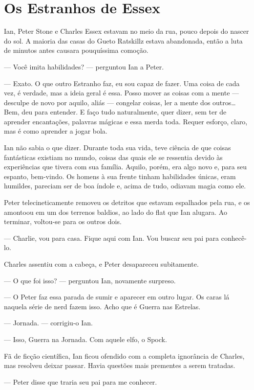 \chapter{Os Estranhos de Essex}

Ian, Peter Stone e Charles Essex estavam no meio da rua, pouco depois do nascer
do sol. A maioria das casas do Gueto Ratskillz estava abandonada, então a luta
de minutos antes causara pouquíssima comoção.

--- Você imita habilidades? --- perguntou Ian a Peter.

--- Exato. O que outro Estranho faz, eu sou capaz de fazer. Uma coisa de cada
vez, é verdade, mas a ideia geral é essa. Posso mover as coisas com a mente ---
desculpe de novo por aquilo, aliás --- congelar coisas, ler a mente dos
outros\ldots\,Bem, deu para entender. E faço tudo naturalmente, quer dizer, sem
ter de aprender encantações, palavras mágicas e essa merda toda. Requer
esforço, claro, mas é como aprender a jogar bola.

Ian não sabia o que dizer. Durante toda sua vida, teve ciência de que coisas
fantásticas existiam no mundo, coisas das quais ele se ressentia devido às
experiências que tivera com sua família. Aquilo, porém, era algo novo e, para
seu espanto, bem-vindo. Os homens à sua frente tinham habilidades únicas, eram
humildes, pareciam ser de boa índole e, acima de tudo, odiavam magia como ele.

Peter telecineticamente removeu os detritos que estavam espalhados pela rua, e
os amontoou em um dos terrenos baldios, ao lado do flat que Ian alugara. Ao
terminar, voltou-se para os outros dois.

--- Charlie, vou para casa. Fique aqui com Ian. Vou buscar seu pai para
conhecê-lo.

Charles assentiu com a cabeça, e Peter desapareceu subitamente.

--- O que foi isso? --- perguntou Ian, novamente surpreso.

--- O Peter faz essa parada de sumir e aparecer em outro lugar. Os caras lá
naquela série de nerd fazem isso. Acho que é Guerra nas Estrelas.

--- Jornada. --- corrigiu-o Ian.

--- Isso, Guerra na Jornada. Com aquele elfo, o Spock.

Fã de ficção científica, Ian ficou ofendido com a completa ignorância de
Charles, mas resolveu deixar passar. Havia questões mais prementes a serem
tratadas.

--- Peter disse que traria seu pai para me conhecer.

